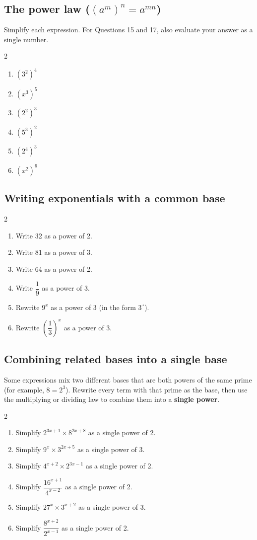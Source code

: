 \documentclass[11pt]{article}
\newcommand{\qspace}{\vspace{0.65cm}}
\newenvironment{qtwocol}{\begin{multicols}{2}\begin{enumerate}[resume]}{\end{enumerate}\end{multicols}}
\begin{document}
\subsection*{The power law ($(a^m)^n = a^{mn}$)}
Simplify each expression. For Questions 15 and 17, also evaluate your answer as a single number.

\begin{qtwocol}
  \item $(3^2)^4$
  \qspace
  \item $(x^3)^5$
  \qspace
  \item $(2^2)^3$
  \qspace
  \item $(5^3)^2$
  \qspace
  \item $(2^4)^3$
  \qspace
  \item $(x^2)^6$
  \qspace
\end{qtwocol}

\subsection*{Writing exponentials with a common base}
\begin{qtwocol}
  \item Write 32 as a power of 2.
  \qspace
  \item Write 81 as a power of 3.
  \qspace
  \item Write 64 as a power of 2.
  \qspace
  \item Write $\dfrac{1}{9}$ as a power of 3.
  \qspace
  \item Rewrite $9^x$ as a power of 3 (in the form $3^{\,\square}$).
  \qspace
  \item Rewrite $\left(\dfrac{1}{3}\right)^x$ as a power of 3.
  \qspace
\end{qtwocol}

\subsection*{Combining related bases into a single base}
Some expressions mix two different bases that are both powers of the same prime (for example, $8 = 2^3$). Rewrite every term with that prime as the base, then use the multiplying or dividing law to combine them into a \textbf{single power}.

\begin{qtwocol}
  \item Simplify $2^{3x+1} \times 8^{2x+8}$ as a single power of 2.
  \qspace
  \item Simplify $9^{x} \times 3^{2x+5}$ as a single power of 3.
  \qspace
  \item Simplify $4^{x+2} \times 2^{3x-1}$ as a single power of 2.
  \qspace
  \item Simplify $\dfrac{16^{x+1}}{4^{x-2}}$ as a single power of 2.
  \qspace
  \item Simplify $27^{x} \times 3^{x+2}$ as a single power of 3.
  \qspace
  \item Simplify $\dfrac{8^{x+2}}{2^{x-1}}$ as a single power of 2.
  \qspace
\end{qtwocol}
\end{document}
